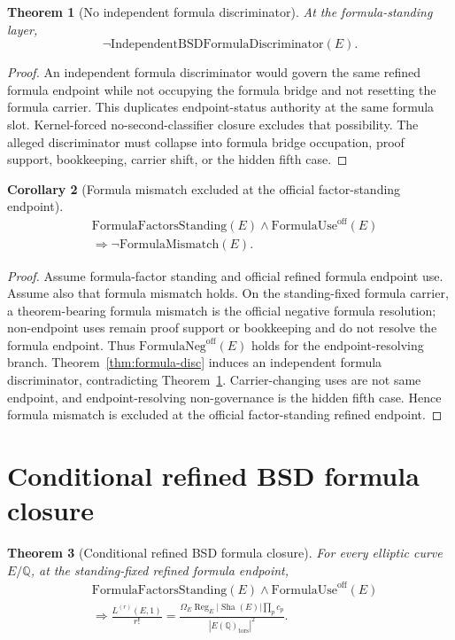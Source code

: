 \documentclass[11pt]{article}
\newtheorem{theorem}{Theorem}[section]
\newtheorem{corollary}[theorem]{Corollary}
\newcommand{\Q}{\mathbb{Q}}
\newcommand{\Sha}{\operatorname{Sha}}
\newcommand{\Reg}{\operatorname{Reg}}
\newcommand{\tors}{\operatorname{tors}}
\newcommand{\FormulaMismatch}{\mathrm{FormulaMismatch}}
\newcommand{\FormulaUse}{\mathrm{FormulaUse}^{\mathrm{off}}}
\newcommand{\FormulaNeg}{\mathrm{FormulaNeg}^{\mathrm{off}}}
\begin{document}
\begin{theorem}[No independent formula discriminator]\label{thm:no-formula-disc}
At the formula-standing layer,
\[
\neg\mathrm{IndependentBSDFormulaDiscriminator}(E).
\]
\end{theorem}

\begin{proof}
An independent formula discriminator would govern the same refined formula endpoint while not occupying the formula bridge and not resetting the formula carrier. This duplicates endpoint-status authority at the same formula slot. Kernel-forced no-second-classifier closure excludes that possibility. The alleged discriminator must collapse into formula bridge occupation, proof support, bookkeeping, carrier shift, or the hidden fifth case.
\end{proof}

\begin{corollary}[Formula mismatch excluded at the official factor-standing endpoint]\label{cor:formula-mismatch-excluded}
\[
\begin{aligned}
&\mathrm{FormulaFactorsStanding}(E)\wedge \FormulaUse(E)\\
&\Rightarrow \neg\FormulaMismatch(E).
\end{aligned}
\]
\end{corollary}

\begin{proof}
Assume formula-factor standing and official refined formula endpoint use. Assume also that formula mismatch holds. On the standing-fixed formula carrier, a theorem-bearing formula mismatch is the official negative formula resolution; non-endpoint uses remain proof support or bookkeeping and do not resolve the formula endpoint. Thus $\FormulaNeg(E)$ holds for the endpoint-resolving branch. Theorem~\ref{thm:formula-disc} induces an independent formula discriminator, contradicting Theorem~\ref{thm:no-formula-disc}. Carrier-changing uses are not same endpoint, and endpoint-resolving non-governance is the hidden fifth case. Hence formula mismatch is excluded at the official factor-standing refined endpoint.
\end{proof}

\section{Conditional refined BSD formula closure}

\begin{theorem}[Conditional refined BSD formula closure]\label{thm:refined-endpoint}
For every elliptic curve $E/\Q$, at the standing-fixed refined formula endpoint,
\[
\begin{aligned}
&\mathrm{FormulaFactorsStanding}(E)\wedge \FormulaUse(E)\\
&\Rightarrow
\frac{L^{(r)}(E,1)}{r!}
=
\frac{\Omega_E\Reg_E |\Sha(E)|\prod_p c_p}
{|E(\Q)_{\tors}|^2}.
\end{aligned}
\]
\end{theorem}
\end{document}

